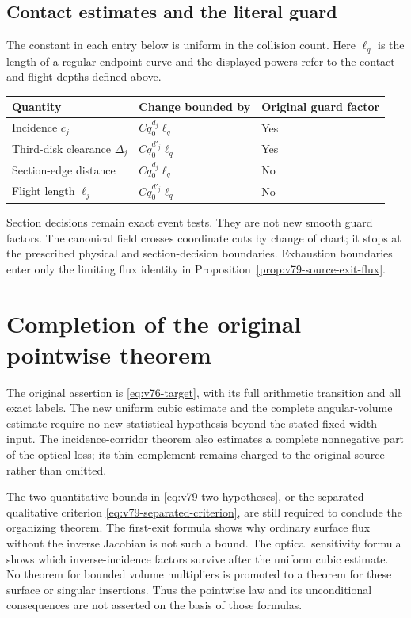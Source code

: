 \documentclass[11pt,reqno]{amsart}
\numberwithin{equation}{section}
\theoremstyle{definition}
\theoremstyle{remark}\newtheorem{remark}[theorem]{Remark}
\begin{document}
\subsection{Contact estimates and the literal guard}
The constant in each entry below is uniform in the collision count.
Here $\ell_q$ is the length of a regular endpoint curve and the displayed
powers refer to the contact and flight depths defined above.
\begin{center}
\begin{tabular}{lll}
Quantity & Change bounded by & Original guard factor\\[2pt]
\hline
Incidence $c_j$ & $Cq_0^{d_j}\ell_q$ & Yes\\
Third-disk clearance $\Delta_j$ & $Cq_0^{d'_j}\ell_q$ & Yes\\
Section-edge distance & $Cq_0^{d_j}\ell_q$ & No\\
Flight length $\ell_j$ & $Cq_0^{d'_j}\ell_q$ & No
\end{tabular}
\end{center}
Section decisions remain exact event tests. They are not new smooth
guard factors. The canonical field crosses coordinate cuts by change
of chart; it stops at the prescribed physical and section-decision
boundaries. Exhaustion boundaries enter only the limiting flux identity
in Proposition~\ref{prop:v79-source-exit-flux}.







\section{Completion of the original pointwise theorem}
The original assertion is \eqref{eq:v76-target}, with its full
arithmetic transition and all exact labels. The new uniform cubic
estimate and the complete angular-volume estimate require no new
statistical hypothesis beyond the stated fixed-width input.
The incidence-corridor theorem also estimates a complete nonnegative
part of the optical loss; its thin complement remains charged to the
original source rather than omitted.

The two quantitative bounds in \eqref{eq:v79-two-hypotheses}, or the
separated qualitative criterion \eqref{eq:v79-separated-criterion},
are still required to conclude the organizing theorem. The first-exit
formula shows why ordinary surface flux without the inverse Jacobian
is not such a bound. The optical sensitivity formula shows which
inverse-incidence factors survive after the uniform cubic estimate.
No theorem for bounded volume multipliers is promoted to a theorem for
these surface or singular insertions. Thus the pointwise law and its
unconditional consequences are not asserted on the basis of those formulas.
\end{document}
